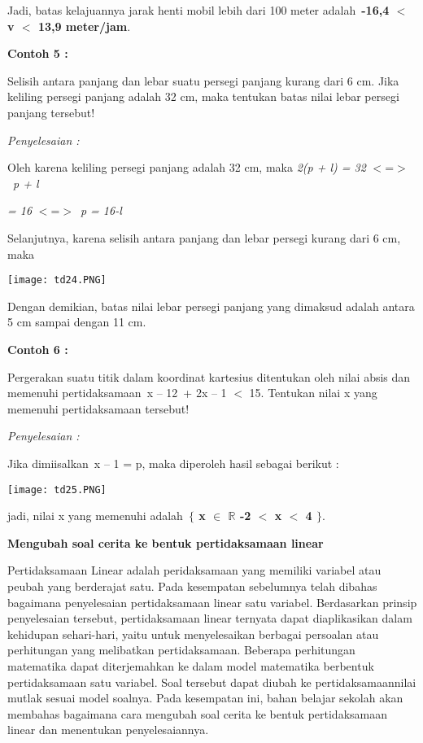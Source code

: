 \documentclass[11pt,fleqn]{book} %
\begin{document}
\noindent Jadi, batas kelajuannya jarak henti mobil lebih dari 100 meter adalah~\textbf{-16,4 $\boldsymbol{<}$ v $\boldsymbol{<}$ 13,9 meter/jam}.

\noindent \textbf{Contoh 5 :}

\noindent Selisih antara panjang dan lebar suatu persegi panjang kurang dari 6 cm. Jika keliling persegi panjang adalah 32 cm, maka tentukan batas nilai lebar persegi panjang tersebut!

\noindent \textit{Penyelesaian :}

\noindent Oleh karena keliling persegi panjang adalah 32 cm, maka \textit{2(p + l) = 32} $<$=$>$~\textit{p + l }

\noindent \textit{= 16} $<$=$>$~\textit{p = 16-l}

\noindent Selanjutnya, karena selisih antara panjang dan lebar persegi kurang dari 6 cm, maka

\noindent \texttt{[image: td24.PNG]}

\noindent Dengan demikian, batas nilai lebar persegi panjang yang dimaksud adalah antara 5 cm sampai dengan 11 cm.

\noindent \textbf{Contoh 6 :}

\noindent Pergerakan suatu titik dalam koordinat kartesius ditentukan oleh nilai absis dan memenuhi pertidaksamaan~{\textbar}x -- 1{\textbar}2~+ 2{\textbar}x -- 1{\textbar} $<$ 15. Tentukan nilai x yang memenuhi pertidaksamaan tersebut!

\noindent \textit{Penyelesaian :}

\noindent Jika dimiisalkan~{\textbar}x -- 1{\textbar} = p, maka diperoleh hasil sebagai berikut :

\noindent \texttt{[image: td25.PNG]}\textbf{}

\noindent jadi, nilai x yang memenuhi adalah~\textbf{$\boldsymbol{\{}$ x $\boldsymbol{\mathrm{\in }}$ $\boldsymbol{\mathrm{\mathbb{R}}}$ {\textbar} -2 $\boldsymbol{<}$ x $\boldsymbol{<}$ 4 $\boldsymbol{\}}$}.

\noindent \textbf{}

\noindent \textbf{Mengubah soal cerita ke bentuk pertidaksamaan linear}

\noindent Pertidaksamaan Linear adalah peridaksamaan yang memiliki variabel atau peubah yang berderajat satu. Pada kesempatan sebelumnya telah dibahas bagaimana penyelesaian pertidaksamaan linear satu variabel. Berdasarkan prinsip penyelesaian tersebut, pertidaksamaan linear ternyata dapat diaplikasikan dalam kehidupan sehari-hari, yaitu untuk menyelesaikan berbagai persoalan atau perhitungan yang melibatkan pertidaksamaan. Beberapa perhitungan matematika dapat diterjemahkan ke dalam model matematika berbentuk pertidaksamaan satu variabel. Soal tersebut dapat diubah ke pertidaksamaannilai mutlak sesuai model soalnya. Pada kesempatan ini, bahan belajar sekolah akan membahas bagaimana cara mengubah soal cerita ke bentuk pertidaksamaan linear dan menentukan penyelesaiannya.
\end{document}

